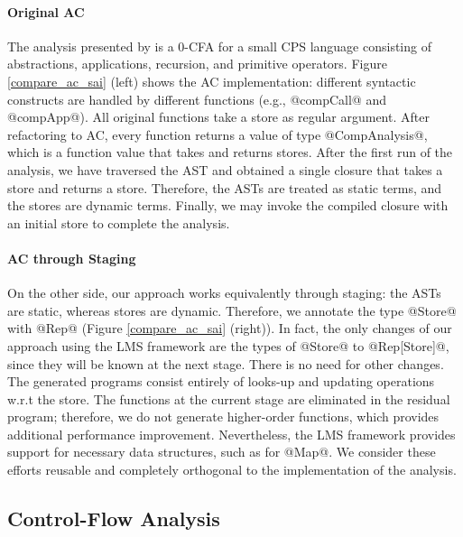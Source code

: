 \paragraph{Original AC}
The analysis presented by \citeauthor{Boucher:1996:ACN:647473.727587} is a 0-CFA
for a small CPS language consisting of abstractions, applications, recursion, and
primitive operators. Figure \ref{compare_ac_sai} (left) shows the AC
implementation: different syntactic constructs are handled by different functions
(e.g., @compCall@ and @compApp@).
All original functions take a store as regular argument. After refactoring to
AC, every function returns a value of type @CompAnalysis@, which is a function
value that takes and returns stores. After the first run of the
analysis, we have traversed the AST and obtained a single closure that takes a
store and returns a store. Therefore, the ASTs are treated as static terms, and
the stores are dynamic terms. Finally, we may invoke the compiled closure with an
initial store to complete the analysis.

\paragraph{AC through Staging}

On the other side, our approach works equivalently through staging: the ASTs
are static, whereas stores are dynamic. Therefore, we annotate the type @Store@
with @Rep@ (Figure \ref{compare_ac_sai} (right)). In fact, the only changes of
our approach using the LMS framework are the types of @Store@ to @Rep[Store]@,
since they will be known at the next stage. There is no need for other changes.
The generated programs consist entirely of looks-up and updating operations
w.r.t the store.  The functions at the current stage are eliminated in the
residual program; therefore, we do not generate higher-order functions, which
provides additional performance improvement. Nevertheless, the LMS framework
provides support for necessary data structures, such as for @Map@.  We consider
these efforts reusable and completely orthogonal to the implementation of the
analysis.

\subsection{Control-Flow Analysis} \label{cfa}

